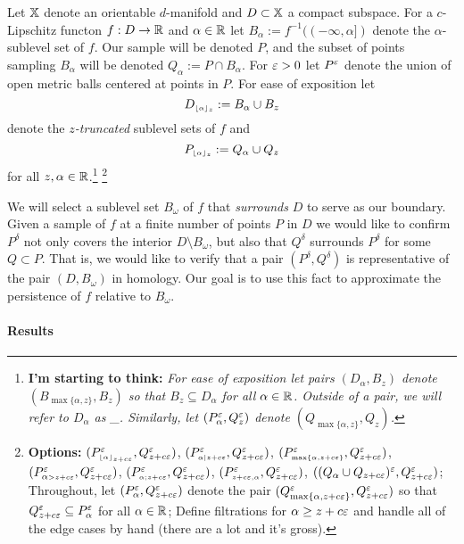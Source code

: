 
Let $\mathbb{X}$ denote an orientable $d$-manifold and $D\subset\mathbb{X}$ a compact subspace.
For a $c$-Lipschitz functon $f : D\to \mathbb{R}$ and $\alpha\in\mathbb{R}$ let $B_\alpha := f^{-1}((-\infty,\alpha])$ denote the $\alpha$-sublevel set of $f$.
Our sample will be denoted $P$, and the subset of points sampling $B_\alpha$ will be denoted $Q_\alpha := P\cap B_\alpha$.
For $\varepsilon > 0$ let $P^\varepsilon$ denote the union of open metric balls centered at points in $P$.
For ease of exposition let
\[ D_{\scriptscriptstyle \lfloor\alpha\rfloor_{z}} := B_\alpha\cup B_z \]
denote the \emph{$z$-truncated} sublevel sets of $f$ and %
\[ P_{\scriptscriptstyle \lfloor\alpha\rfloor_{z}} := Q_\alpha\cup Q_z\]
for all $z,\alpha\in\mathbb{R}$.\footnote{\textbf{I'm starting to think:} \emph{For ease of exposition let pairs $(D_\alpha, B_z)$ denote $(B_{\scriptscriptstyle\max\{\alpha,z\}},B_z)$ so that $B_z\subseteq D_\alpha$ for all $\alpha\in\mathbb{R}$. Outside of a pair, we will refer to $D_\alpha$ as \_. Similarly, let $(P_\alpha^\varepsilon, Q_z^\varepsilon)$ denote $(Q_{\scriptscriptstyle\max\{\alpha,z\}}, Q_z)$.}}
\footnote{\textbf{Options:}
  $(P_{\scriptscriptstyle \lfloor\alpha\rfloor_{z+c\varepsilon}}^\varepsilon, Q_{z+c\varepsilon}^\varepsilon)$,
  $(P_{\scriptscriptstyle\alpha\mid z+c\varepsilon}^\varepsilon, Q_{z+c\varepsilon}^\varepsilon)$,
  $(P_{\scriptscriptstyle\max\{\alpha, z+c\varepsilon\}}^\varepsilon, Q_{z+c\varepsilon}^\varepsilon)$,
  $(P_{\alpha {\scriptscriptstyle  > z+c\varepsilon}}^\varepsilon, Q_{z+c\varepsilon}^\varepsilon)$,
  $(P_{\scriptscriptstyle \alpha; z+c\varepsilon}^\varepsilon, Q_{z+c\varepsilon}^\varepsilon)$,
  $(P_{\scriptscriptstyle z+c\varepsilon, \alpha}^\varepsilon, Q_{z+c\varepsilon}^\varepsilon)$,
  $((Q_\alpha\cup Q_{z+c\varepsilon})^\varepsilon, Q_{z+c\varepsilon}^\varepsilon)$;
  Throughout, let $(P_\alpha^\varepsilon, Q_{z+c\varepsilon}^\varepsilon)$ denote the pair $(Q_{\max\{\alpha, z+c\varepsilon\}}^\varepsilon, Q_{z+c\varepsilon}^\varepsilon)$ so that $Q_{z+c\varepsilon}^\varepsilon \subseteq P_\alpha^\varepsilon$ for all $\alpha\in\mathbb{R}$;
  Define filtrations for $\alpha\geq z+c\varepsilon$ and handle all of the edge cases by hand (there are a lot and it's gross).
}

We will select a sublevel set $B_\omega$ of $f$ that \emph{surrounds} $D$ to serve as our boundary.
Given a sample of $f$ at a finite number of points $P$ in $D$ we would like to confirm $P^\delta$ not only covers the interior $D\setminus B_\omega$, but also that $Q^\delta$ surrounds $P^\delta$ for some $Q\subset P$.
That is, we would like to verify that a pair $(P^\delta, Q^\delta)$ is %
representative of the pair $(D,B_\omega)$ in homology.
Our goal is to use this fact to approximate the persistence of $f$ relative to $B_\omega$.

\paragraph*{Results}


